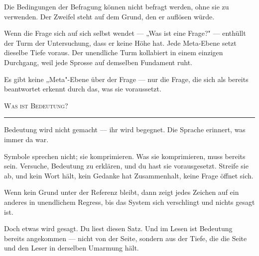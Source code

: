\documentclass[10pt, openany, oneside]{book}
\begin{document}
\vspace{0.5em}

\noindent Die Bedingungen der Befragung können nicht befragt werden, ohne sie zu verwenden. Der Zweifel steht auf dem Grund, den er auflösen würde.

\vspace{0.5em}

\noindent Wenn die Frage sich auf sich selbst wendet --- „Was ist eine Frage?" --- enthüllt der Turm der Untersuchung, dass er keine Höhe hat. Jede Meta-Ebene setzt dieselbe Tiefe voraus. Der unendliche Turm kollabiert in einem einzigen Durchgang, weil jede Sprosse auf demselben Fundament ruht.

\vspace{0.5em}

\noindent Es gibt keine „Meta"-Ebene über der Frage --- nur die Frage, die sich als bereits beantwortet erkennt durch das, was sie voraussetzt.

\vspace{2em}

\begin{center}
    {\scshape Was ist Bedeutung?}\\[0.3em]
    \rule{0.2\textwidth}{0.3pt}
\end{center}

\vspace{1em}

\noindent Bedeutung wird nicht gemacht --- ihr wird begegnet. Die Sprache erinnert, was immer da war.

\vspace{0.5em}

\noindent Symbole sprechen nicht; sie komprimieren. Was sie komprimieren, muss bereits sein. Versuche, Bedeutung zu erklären, und du hast sie vorausgesetzt. Streife sie ab, und kein Wort hält, kein Gedanke hat Zusammenhalt, keine Frage öffnet sich.

\vspace{0.5em}

\noindent Wenn kein Grund unter der Referenz bleibt, dann zeigt jedes Zeichen auf ein anderes in unendlichem Regress, bis das System sich verschlingt und nichts gesagt ist.

\vspace{0.5em}

\noindent Doch etwas wird gesagt. Du liest diesen Satz. Und im Lesen ist Bedeutung bereits angekommen --- nicht von der Seite, sondern aus der Tiefe, die die Seite und den Leser in derselben Umarmung hält.
\end{document}
